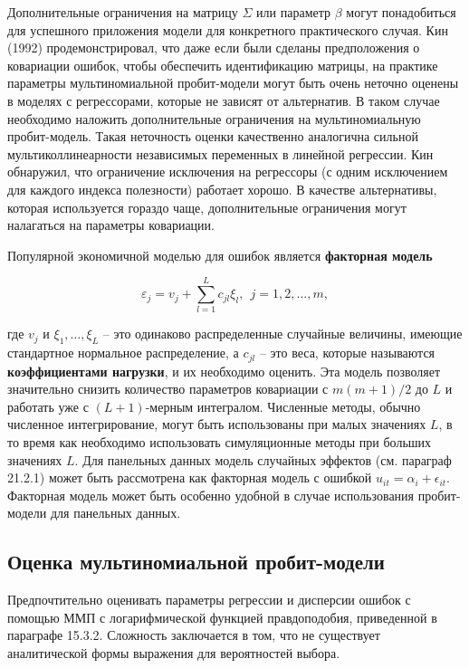 Дополнительные ограничения на матрицу $\Sigma $ или параметр $\beta $ могут понадобиться для успешного приложения модели для конкретного практического случая. Кин (1992) продемонстрировал, что даже если были сделаны предположения о ковариации ошибок, чтобы обеспечить идентификацию матрицы, на практике параметры мультиномиальной пробит-модели могут быть очень неточно оценены в моделях с регрессорами, которые не зависят от альтернатив. В таком случае необходимо наложить дополнительные ограничения на мультиномиальную пробит-модель. Такая неточность оценки качественно аналогична сильной мультиколлинеарности независимых переменных в линейной регрессии. Кин обнаружил, что ограничение исключения на регрессоры (с одним исключением для каждого индекса полезности) работает хорошо.  В качестве альтернативы, которая используется гораздо чаще, дополнительные ограничения могут налагаться на параметры ковариации.

Популярной экономичной моделью для ошибок является \textbf{факторная модель}

\[{\varepsilon }_j=v_j+\sum^L_{l=1}{c_{jl}{\xi }_l,\ \ j=1,2,\dots ,m,}\] 

где $v_j$ и ${\xi }_1,\dots ,{\xi }_L$ -- это  одинаково распределенные случайные величины, имеющие стандартное нормальное распределение, а $c_{jl}$ -- это веса, которые называются \textbf{коэффициентами нагрузки}, и их необходимо оценить. Эта модель позволяет значительно снизить количество параметров ковариации с $m(m+1)/2$ до $L$ и работать уже с $(L+1)$-мерным интегралом. Численные методы, обычно численное интегрирование, могут быть использованы при малых значениях $L$, в то время как необходимо использовать симуляционные методы при больших значениях $L$. Для панельных данных модель случайных эффектов (см. параграф 21.2.1) может быть рассмотрена как факторная модель с ошибкой $u_{it}={\alpha }_i+\epsilon_{it}$. Факторная модель может быть особенно удобной в случае использования пробит-модели для панельных данных.

\subsection{Оценка мультиномиальной пробит-модели}

Предпочтительно оценивать параметры регрессии и дисперсии ошибок с помощью ММП с логарифмической функцией правдоподобия, приведенной в параграфе 15.3.2. Сложность заключается в том, что не существует аналитической формы выражения для вероятностей выбора.

